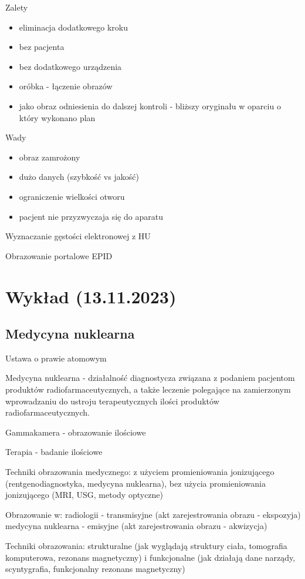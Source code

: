 \documentclass{article}
\begin{document}
Zalety
\begin{itemize}
    \item eliminacja dodatkowego kroku
    \item bez pacjenta
    \item bez dodatkowego urządzenia
    \item oróbka - łączenie obrazów
    \item jako obraz odniesienia do dalszej kontroli - bliższy oryginału w oparciu o który wykonano plan
\end{itemize}
Wady
\begin{itemize}
    \item obraz zamrożony
    \item dużo danych (szybkość vs jakość)
    \item ograniczenie wielkości otworu
    \item pacjent nie przyzwyczaja się do aparatu
\end{itemize}

Wyznaczanie gęstości elektronowej z HU

Obrazowanie portalowe EPID

\section{Wykład (13.11.2023)}

\subsection{Medycyna nuklearna}

Ustawa o prawie atomowym

Medycyna nuklearna - działalność diagnostycza związana z podaniem pacjentom produktów radiofarmaceutycznych, a także leczenie polegające na zamierzonym wprowadzaniu do ustroju terapeutycznych ilości produktów radiofarmaceutycznych.

Gammakamera - obrazowanie ilościowe

Terapia - badanie ilościowe

Techniki obrazowania medycznego: z użyciem promieniowania jonizującego (rentgenodiagnostyka, medycyna nuklearna), bez użycia promieniowania jonizującego (MRI, USG, metody optyczne)

Obrazowanie w:
radiologii - transmisyjne (akt zarejestrowania obrazu - ekspozyja)
medycyna nuklearna - emisyjne (akt zarejestrowania obrazu - akwizycja)

Techniki obrazowania: strukturalne (jak wyglądają struktury ciała, tomografia komputerowa, rezonans magnetyczny) i funkcjonalne (jak działają dane narządy, scyntygrafia, funkcjonalny rezonans magnetyczny)
\end{document}
